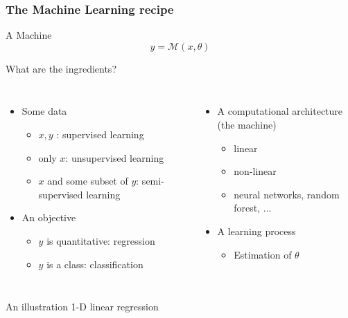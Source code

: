 \documentclass[handout]{beamer}
\begin{document}
\begin{frame}
\frametitle{The Machine Learning recipe}
\begin{block}{A Machine}
\begin{equation*}
y = \mathcal{M}(x,\theta)
\end{equation*}
\end{block}
What are \alert{the ingredients}? 
\begin{columns}[t]


\begin{itemize}
    \item<2-> Some \alert{data}
    \begin{itemize}
        \item $x,y$ : supervised learning
        \item only $x$: unsupervised learning
        \item $x$ and some subset of $y$: semi-supervised learning
    \end{itemize}
    
    
    \item<3-> An \alert{objective}
        \begin{itemize}
\item $y$ is quantitative: regression
\item $y$ is a class: classification
    \end{itemize}
    \end{itemize}
    

\begin{itemize}
    \item<4-> A computational architecture (the \alert{machine})
        \begin{itemize}
        \item linear
        \item non-linear
        \item neural networks, random forest, ...
    \end{itemize}
    \item<5-> A \alert{learning} process
    \begin{itemize}
        \item Estimation of $\theta$
    \end{itemize}
\end{itemize}

\end{columns}

\end{frame}
\begin{frame}{An illustration}
    1-D linear regression
\end{frame}
\end{document}
